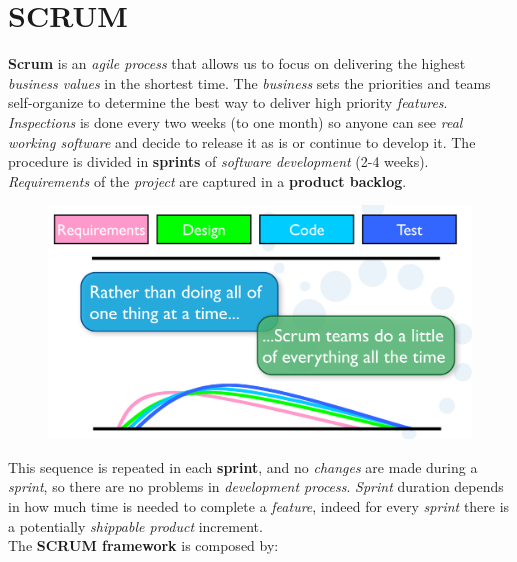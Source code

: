 \documentclass{article}
\begin{document}
\section{SCRUM}
\textbf{Scrum} is an \emph{agile process} that allows us to focus on delivering the highest \emph{business values} in the shortest time. The \emph{business} sets the priorities and teams self-organize to determine the best way to deliver high priority \emph{features}. \emph{Inspections} is done every two weeks (to one month) so anyone can see \emph{real working software} and decide to release it as is or continue to develop it. The procedure is divided in \textbf{sprints} of \emph{software development} (2-4 weeks). \emph{Requirements} of the \emph{project} are captured in a \textbf{product backlog}. 
\begin{figure}[H]
  \centering
  \includegraphics[scale=0.35]{cattura1.png}
\end{figure}
\hfill \break
This sequence is repeated in each \textbf{sprint}, and no \emph{changes} are made during a \emph{sprint}, so there are no problems in \emph{development process}. \emph{Sprint} duration depends in how much time is needed to complete a \emph{feature}, indeed for every \emph{sprint} there is a potentially \emph{shippable product} increment. \\
\clearpage
The \textbf{SCRUM framework} is composed by:
\end{document}
